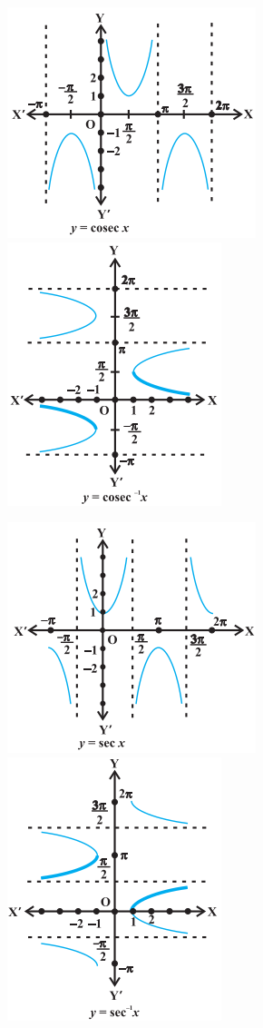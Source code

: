 \documentclass[12pt]{article}
\begin{document}
\begin{multicols}{2}
\includegraphics[scale=0.5]{4.png}
\includegraphics[scale=0.5]{41.png}


\includegraphics[scale=0.5]{5.png}
\includegraphics[scale=0.5]{51.png}


\end{multicols}
\end{document}
